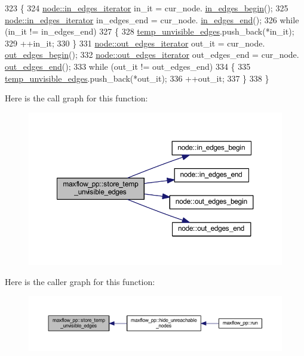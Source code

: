 \begin{DoxyCode}
323 \{
324     \mbox{\hyperlink{classnode_a9a96be92add7c1a2771bcd0431ebf8ab}{node::in\_edges\_iterator}} in\_it = cur\_node.
      \mbox{\hyperlink{classnode_a0c32377f370ae52ed2134ff8d4dac584}{in\_edges\_begin}}();
325     \mbox{\hyperlink{classnode_a9a96be92add7c1a2771bcd0431ebf8ab}{node::in\_edges\_iterator}} in\_edges\_end = cur\_node.
      \mbox{\hyperlink{classnode_a785cd330f8b4c5c47d3b6e936a7e744e}{in\_edges\_end}}();
326     \textcolor{keywordflow}{while} (in\_it != in\_edges\_end)
327     \{
328     \mbox{\hyperlink{classmaxflow__pp_aae17915904c0d17632df70aac9fe88b0}{temp\_unvisible\_edges}}.push\_back(*in\_it);
329     ++in\_it;
330     \}
331     \mbox{\hyperlink{classnode_a90e17ed34de55072e8077f4367499a98}{node::out\_edges\_iterator}} out\_it = cur\_node.
      \mbox{\hyperlink{classnode_a7dcb80df22118cea04f77ca8c952d9c2}{out\_edges\_begin}}();
332     \mbox{\hyperlink{classnode_a90e17ed34de55072e8077f4367499a98}{node::out\_edges\_iterator}} out\_edges\_end = cur\_node.
      \mbox{\hyperlink{classnode_a7ce2ba5195a63d4df6b44299a02a9378}{out\_edges\_end}}();
333     \textcolor{keywordflow}{while} (out\_it != out\_edges\_end)
334     \{
335     \mbox{\hyperlink{classmaxflow__pp_aae17915904c0d17632df70aac9fe88b0}{temp\_unvisible\_edges}}.push\_back(*out\_it);
336     ++out\_it;
337     \}
338 \}
\end{DoxyCode}
Here is the call graph for this function\+:\nopagebreak
\begin{figure}[H]
\begin{center}
\leavevmode
\includegraphics[width=350pt]{classmaxflow__pp_abb23812a3e8bca1955b835d3c41836e1_cgraph}
\end{center}
\end{figure}
Here is the caller graph for this function\+:\nopagebreak
\begin{figure}[H]
\begin{center}
\leavevmode
\includegraphics[width=350pt]{classmaxflow__pp_abb23812a3e8bca1955b835d3c41836e1_icgraph}
\end{center}
\end{figure}


